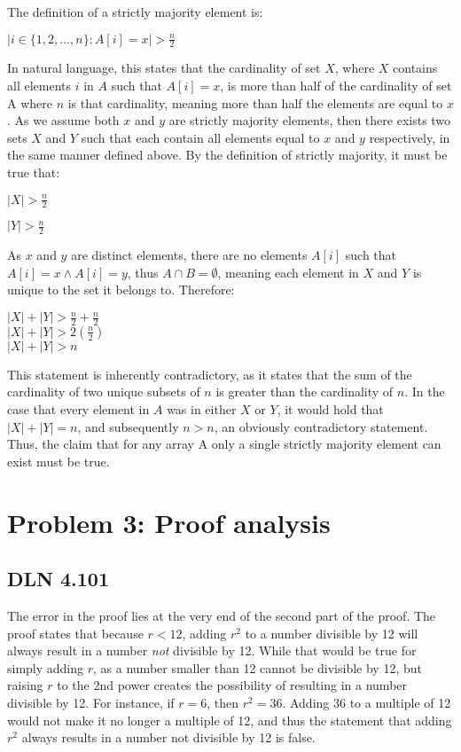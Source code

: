 \documentclass[titlepage]{article}
\begin{document}
The definition of a strictly majority element is:
\begin{center}
\(|{i \in \{1,2,...,n\}:A[i]=x}|>\frac{n}{2}\)
\end{center}
In natural language, this states that the cardinality of set $X$, where $X$ contains all elements $i$ in $A$ such that $A[i] = x$, is more than half of the cardinality of set A where $n$ is that cardinality, meaning more than half the elements are equal to $x$. As we assume both $x$ and $y$ are strictly majority elements, then there exists two sets $X$ and $Y$ such that each contain all elements equal to $x$ and $y$ respectively, in the same manner defined above. By the definition of strictly majority, it must be true that:
\begin{center}
\( |X| > \frac{n}{2} \)

\( |Y| > \frac{n}{2} \)
\end{center}
As $x$ and $y$ are distinct elements, there are no elements $A[i]$ such that $A[i] = x \land A[i] = y$, thus $A \cap B = \emptyset$, meaning each element in $X$ and $Y$ is unique to the set it belongs to. Therefore:
\begin{center}
\( |X| + |Y| > \frac{n}{2} + \frac{n}{2} \)\\
\( |X| + |Y| > 2(\frac{n}{2})\)\\
\( |X| + |Y| > n\)\\
\end{center}
This statement is inherently contradictory, as it states that the sum of the cardinality of two unique subsets of $n$ is greater than the cardinality of $n$. In the case that every element in $A$ was in either $X$ or $Y$, it would hold that \( |X| + |Y| = n\), and subsequently $n > n$, an obviously contradictory statement. Thus, the claim that for any array A only a single strictly majority element can exist must be true.

\section{Problem 3: Proof analysis}

\subsection{DLN 4.101}  %

The error in the proof lies at the very end of the second part of the proof. The proof states that because $r < 12$, adding $r^2$ to a number divisible by 12 will always result in a number \textit{not} divisible by 12. While that would be true for simply adding $r$, as a number smaller than 12 cannot be divisible by 12, but raising $r$ to the 2nd power creates the possibility of resulting in a number divisible by 12. For instance, if $r = 6$, then $r^2=36$. Adding 36 to a multiple of 12 would not make it no longer a multiple of 12, and thus the statement that adding $r^2$ always results in a number not divisible by 12 is false.
\end{document}
